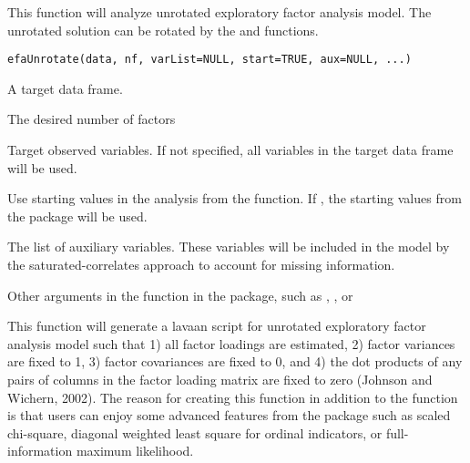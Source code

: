 \documentclass[a4paper]{book}
\begin{document}
%
\begin{Description}\relax
This function will analyze unrotated exploratory factor analysis model. The unrotated solution can be rotated by the  and  functions.
\end{Description}
%
\begin{Usage}
\begin{verbatim}
efaUnrotate(data, nf, varList=NULL, start=TRUE, aux=NULL, ...)
\end{verbatim}
\end{Usage}
%
\begin{Arguments}
\begin{ldescription}
\item[\code{data}] 
A target data frame. 

\item[\code{nf}] 
The desired number of factors

\item[\code{varList}] 
Target observed variables. If not specified, all variables in the target data frame will be used.

\item[\code{start}] 
Use starting values in the analysis from the  function. If , the starting values from the  package will be used.

\item[\code{aux}] 
The list of auxiliary variables. These variables will be included in the model by the saturated-correlates approach to account for missing information.

\item[\code{...}] 
Other arguments in the  function in the  package, such as , , or 

\end{ldescription}
\end{Arguments}
%
\begin{Details}\relax
This function will generate a lavaan script for unrotated exploratory factor analysis model such that 1) all factor loadings are estimated, 2) factor variances are fixed to 1, 3) factor covariances are fixed to 0, and 4) the dot products of any pairs of columns in the factor loading matrix are fixed to zero (Johnson and Wichern, 2002). The reason for creating this function in addition to the  function is that users can enjoy some advanced features from the  package such as scaled chi-square, diagonal weighted least square for ordinal indicators, or full-information maximum likelihood.
\end{Details}
\end{document}
